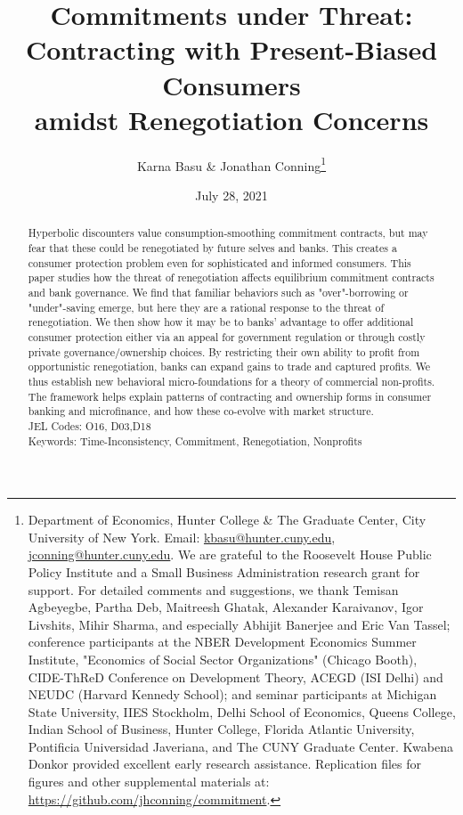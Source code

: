 \documentclass[11pt,english]{article}
\date{July 28, 2021}\usepackage{babel}
\theoremstyle{plain}
\theoremstyle{definition}
\begin{document}

\title{Commitments under Threat:\\Contracting with Present-Biased Consumers\\amidst Renegotiation Concerns}

\author{Karna Basu \& Jonathan Conning\thanks{Department of Economics, Hunter College \& The Graduate Center, City
University of New York. Email: \href{mailto:kbasu@hunter.cuny.edu}{kbasu@hunter.cuny.edu}, \href{mailto:jconning@hunter.cuny.edu}{jconning@hunter.cuny.edu}.
We are grateful to the Roosevelt House Public Policy Institute and
a Small Business Administration research grant for support. For detailed
comments and suggestions, we thank Temisan Agbeyegbe, Partha Deb, Maitreesh Ghatak, Alexander Karaivanov, Igor Livshits, Mihir Sharma, and especially Abhijit Banerjee and Eric Van Tassel; conference participants at the NBER Development
Economics Summer Institute, "Economics of Social Sector Organizations"
(Chicago Booth), CIDE-ThReD Conference on Development Theory, ACEGD
(ISI Delhi) and NEUDC (Harvard Kennedy School); and seminar participants
at Michigan State University, IIES Stockholm, Delhi School of Economics,
Queens College, Indian School of Business, Hunter College, Florida
Atlantic University, Pontificia Universidad Javeriana, and The CUNY Graduate
Center. Kwabena Donkor provided excellent early research assistance.
Replication files for figures and other supplemental materials at:
\protect\url{https://github.com/jhconning/commitment}.}}




\maketitle

\begin{abstract}
Hyperbolic discounters value consumption-smoothing commitment contracts, but may fear that these could be renegotiated by future selves and banks. This creates a consumer protection problem even for sophisticated and informed consumers. This paper studies how the threat of renegotiation affects equilibrium commitment contracts and bank governance. We find that familiar behaviors such as "over"-borrowing or "under"-saving emerge, but here they are a rational response to the threat of renegotiation. We then show how it may be to banks' advantage to offer additional consumer protection either via an appeal for government regulation or through costly private governance/ownership choices. By restricting their own ability to profit from opportunistic renegotiation, banks can expand gains to trade and captured profits. We thus establish new behavioral micro-foundations for a theory of commercial non-profits. The framework helps explain patterns of contracting and ownership forms in consumer banking and microfinance, and how these co-evolve with market structure.   
\\JEL Codes: O16, D03,D18 
\\Keywords: Time-Inconsistency, Commitment, Renegotiation, Nonprofits
\end{abstract}
\vspace{\baselineskip}
\end{document}
